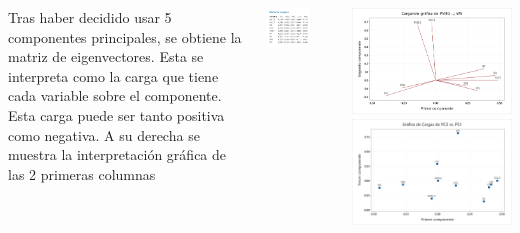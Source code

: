 \documentclass[a0paper,portrait,margin=0pt, colspace=24pt,subcolspace=0pt,blockverticalspace=36pt,innermargin=50pt]{tikzposter}
\begin{document}
\begin{columns}
{			\raggedright

	Tras haber decidido usar 5 componentes principales, se obtiene la matriz de eigenvectores. Esta se interpreta como la carga que tiene cada variable sobre el componente. Esta carga puede ser tanto positiva como negativa. A su derecha se muestra la interpretaci\'{o}n gr\'{a}fica de las 2 primeras columnas 
	
	\centering
	
	\includegraphics[scale=1.5]{Figures/vectoresPropios.png}
	
	\\
		\raggedright

	\includegraphics[scale=1.3]{Figures/cargas.png}
	\includegraphics[scale=.69]{Figures/image.png}
	
}
\end{columns}
\end{document}
